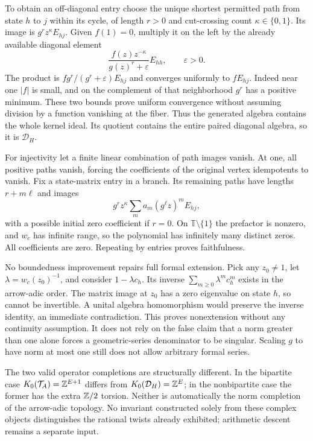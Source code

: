To obtain an off-diagonal entry choose the unique shortest permitted path from state $h$ to $j$ within its cycle, of length $r>0$ and cut-crossing count $\kappa\in\{0,1\}$. Its image is $g^rz^\kappa E_{hj}$. Given $f(1)=0$, multiply it on the left by the already available diagonal element
\[
 \frac{f(z)z^{-\kappa}}{g(z)^r+\varepsilon}E_{hh},\qquad \varepsilon>0.
\]
The product is $f g^r/(g^r+\varepsilon)E_{hj}$ and converges uniformly to $fE_{hj}$. Indeed near one $|f|$ is small, and on the complement of that neighborhood $g^r$ has a positive minimum. These two bounds prove uniform convergence without assuming division by a function vanishing at the fiber. Thus the generated algebra contains the whole kernel ideal. Its quotient contains the entire paired diagonal algebra, so it is $\mathcal D_H$.

For injectivity let a finite linear combination of path images vanish. At one, all positive paths vanish, forcing the coefficients of the original vertex idempotents to vanish. Fix a state-matrix entry in a branch. Its remaining paths have lengths $r+m\ell$ and images
\[
 g^rz^\kappa\sum_m a_m(g^\ell z)^m E_{hj},
\]
with a possible initial zero coefficient if $r=0$. On $\mathbb T\setminus\{1\}$ the prefactor is nonzero, and $w_c$ has infinite range, so the polynomial has infinitely many distinct zeros. All coefficients are zero. Repeating by entries proves faithfulness.

No boundedness improvement repairs full formal extension. Pick any $z_0\ne1$, let $\lambda=w_c(z_0)^{-1}$, and consider $1-\lambda c_h$. Its inverse $\sum_{m\ge0}\lambda^m c_h^m$ exists in the arrow-adic order. The matrix image at $z_0$ has a zero eigenvalue on state $h$, so cannot be invertible. A unital algebra homomorphism would preserve the inverse identity, an immediate contradiction. This proves nonextension without any continuity assumption. It does not rely on the false claim that a norm greater than one alone forces a geometric-series denominator to be singular. Scaling $g$ to have norm at most one still does not allow arbitrary formal series.

The two valid operator completions are structurally different. In the bipartite case $K_0(\mathcal T_A)=\mathbb Z^{E+1}$ differs from $K_0(\mathcal D_H)=\mathbb Z^E$; in the nonbipartite case the former has the extra $\mathbb Z/2$ torsion. Neither is automatically the norm completion of the arrow-adic topology. No invariant constructed solely from these complex objects distinguishes the rational twists already exhibited; arithmetic descent remains a separate input.

